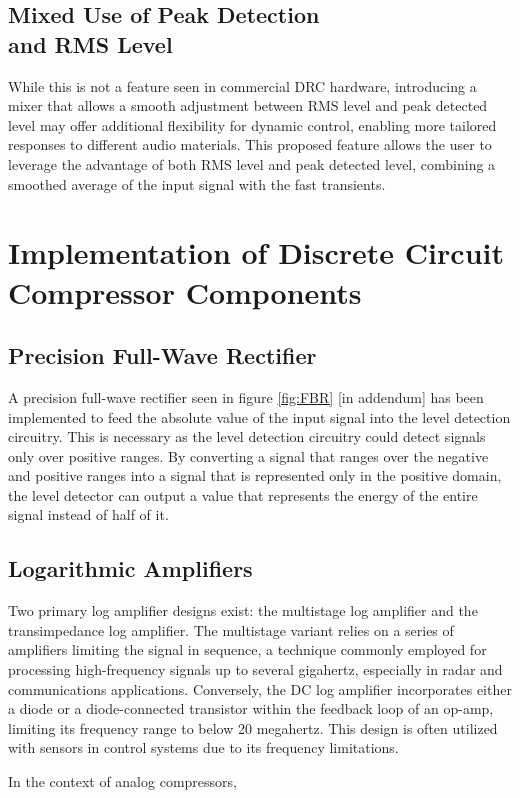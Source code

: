 \documentclass[10pt]{article}
\begin{document}
\begin{multicols*}{2}
            \subsection[Mixed Use of Peak Detection and RMS Level]{Mixed Use of Peak Detection\\and RMS Level} \label{sect:rms-peak-mix}
                While this is not a feature seen in commercial DRC hardware, introducing a mixer that allows a smooth adjustment between RMS level and peak detected level may offer additional flexibility for dynamic control, enabling more tailored responses to different audio materials.
                This proposed feature allows the user to leverage the advantage of both RMS level and peak detected level, combining a smoothed average of the input signal with the fast transients.
            
        \section{Implementation of Discrete Circuit Compressor Components}

            \subsection{Precision Full-Wave Rectifier}
                A precision full-wave rectifier seen in figure \ref{fig:FBR} [in addendum] has been implemented to feed the absolute value of the input signal into the level detection circuitry. This is necessary as the level detection circuitry could detect signals only over positive ranges. By converting a signal that ranges over the negative and positive ranges into a signal that is represented only in the positive domain, the level detector can output a value that represents the energy of the entire signal instead of half of it.
                
            \subsection{Logarithmic Amplifiers} \label{sect:log-amp}
                Two primary log amplifier designs exist: the multistage log amplifier and the transimpedance log amplifier. The multistage variant relies on a series of amplifiers limiting the signal in sequence, a technique commonly employed for processing high-frequency signals up to several gigahertz, especially in radar and communications applications. Conversely, the DC log amplifier incorporates either a diode or a diode-connected transistor within the feedback loop of an op-amp, limiting its frequency range to below 20 megahertz. This design is often utilized with sensors in control systems due to its frequency limitations.\par
                In the context of analog compressors,  


\end{multicols*}
\end{document}
